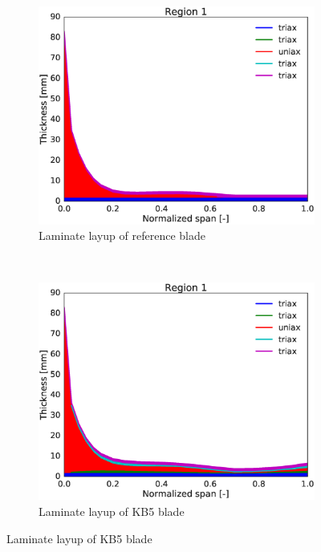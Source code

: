 \begin{figure}[tph]
\begin{subfigure}{0.50\textwidth}
\centering
\includegraphics[width=\linewidth]{figures/KB6_final/baseline_laminate_layers_r01.eps}
\caption{Laminate layup of reference blade}
\label{subfig:baseline_layers_r01}
\end{subfigure}
 ~
\begin{subfigure}{0.50\textwidth}
\includegraphics[width=\linewidth]{figures/KB6_final/KB5_laminate_layers_r01.eps}
\caption{Laminate layup of KB5 blade}
\label{subfig:KB5_layers_r01}
\end{subfigure}


\end{figure}
